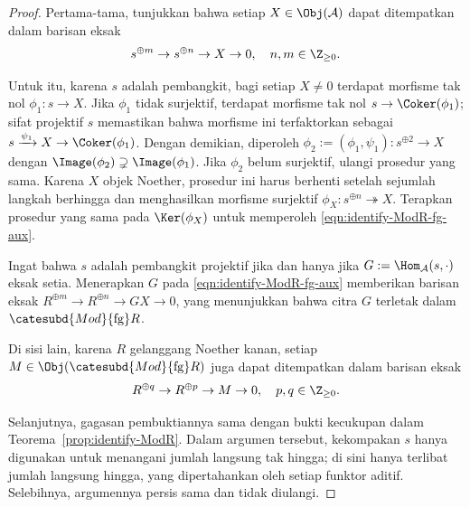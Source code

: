 \begin{proof}
	Pertama-tama, tunjukkan bahwa setiap $X\in\Obj(\mathcal{A})$ dapat
	ditempatkan dalam barisan eksak
	\begin{equation}\label{eqn:identify-ModR-fg-aux}
		s^{\oplus m} \to s^{\oplus n} \to X \to 0, \quad n, m \in \Z_{\geq 0}.
	\end{equation}

	Untuk itu, karena $s$ adalah pembangkit, bagi setiap $X\neq0$ terdapat
	morfisme tak nol $\phi_1:s\to X$. Jika $\phi_1$ tidak surjektif, terdapat
	morfisme tak nol $s\to\Coker(\phi_1)$; sifat projektif $s$ memastikan bahwa
	morfisme ini terfaktorkan sebagai
	$s\xrightarrow{\psi_1}X\to\Coker(\phi_1)$. Dengan demikian, diperoleh
	$\phi_2:=(\phi_1,\psi_1):s^{\oplus2}\to X$ dengan
	$\Image(\phi_2)\supsetneq\Image(\phi_1)$. Jika $\phi_2$ belum surjektif,
	ulangi prosedur yang sama. Karena $X$ objek Noether, prosedur ini harus
	berhenti setelah sejumlah langkah berhingga dan menghasilkan morfisme
	surjektif $\phi_X:s^{\oplus n}\twoheadrightarrow X$. Terapkan prosedur yang
	sama pada $\Ker(\phi_X)$ untuk memperoleh
	\eqref{eqn:identify-ModR-fg-aux}.

	Ingat bahwa $s$ adalah pembangkit projektif jika dan hanya jika
	$G:=\Hom_{\mathcal{A}}(s,\mathord\cdot)$ eksak setia. Menerapkan $G$ pada
	\eqref{eqn:identify-ModR-fg-aux} memberikan barisan eksak
	$R^{\oplus m}\to R^{\oplus n}\to GX\to0$, yang menunjukkan bahwa citra
	$G$ terletak dalam $\catesubd{Mod}{\mathrm{fg}}R$.

	Di sisi lain, karena $R$ gelanggang Noether kanan, setiap
	$M\in\Obj(\catesubd{Mod}{\mathrm{fg}}R)$ juga dapat ditempatkan dalam
	barisan eksak
	\[ R^{\oplus q} \to R^{\oplus p} \to M \to 0, \quad p, q \in \Z_{\geq 0}. \]

	Selanjutnya, gagasan pembuktiannya sama dengan bukti kecukupan dalam
	Teorema~\ref{prop:identify-ModR}. Dalam argumen tersebut, kekompakan $s$
	hanya digunakan untuk menangani jumlah langsung tak hingga; di sini hanya
	terlibat jumlah langsung hingga, yang dipertahankan oleh setiap funktor
	aditif. Selebihnya, argumennya persis sama dan tidak diulangi.
\end{proof}
